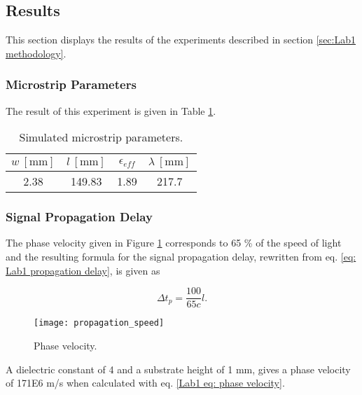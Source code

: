 \documentclass[report.tex]{subfiles}
\begin{document}
\subsection{Results}
This section displays the results of the experiments described in section \ref{sec:Lab1 methodology}.

\subsubsection{Microstrip Parameters}
The result of this experiment is given in Table \ref{table: Lab1 Simulated Microstrip parameters}.

\begin{table}[h]
    \centering
    \caption{Simulated microstrip parameters.\label{table: Lab1 Simulated Microstrip parameters}}
    \begin{tabular}{c | c | c | c}
        $w\: [\text{mm}]$ & $l\: [\text{mm}]$ & $\epsilon_{eff}$ & $\lambda\: [\text{mm}]$\\
        \hline
		2.38 & 149.83 & 1.89 & 217.7
    \end{tabular}
\end{table}

\subsubsection{Signal Propagation Delay}\label{subsubsec:Lab 1 Signal propagation delay}

The phase velocity given in Figure \ref{fig:Lab1 phase velocity} corresponds to 65 \% of the speed of light and the resulting formula for the signal propagation delay, rewritten from eq. \ref{eq: Lab1 propagation delay}, is given as

\begin{equation}
	\Delta t_p = \dfrac{100}{65 c}l.
\end{equation}

\vspace*{\fill}

\begin{figure}[h]
    \centering
	\texttt{[image: propagation\_speed]}
	\caption{Phase velocity.}
	\label{fig:Lab1 phase velocity}
\end{figure}

A dielectric constant of 4 and a substrate height of 1 mm, gives a phase velocity of 171E6 m/s when calculated with eq. \ref{Lab1 eq: phase velocity}.

\vspace*{\fill}
\end{document}
